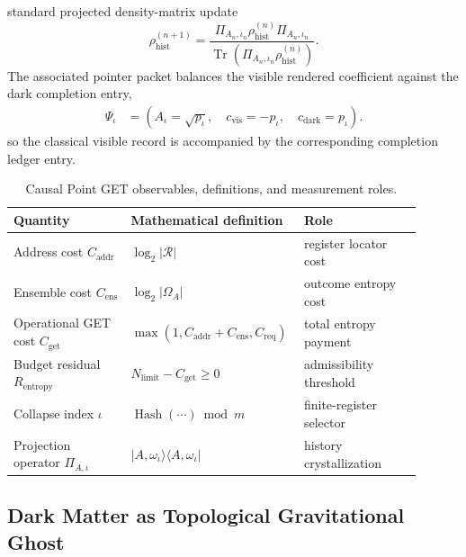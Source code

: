 \documentclass[11pt,letterpaper]{article}
\theoremstyle{plain}
\DeclareMathOperator{\Tr}{Tr}
\begin{document}
standard projected density-matrix update
\begin{equation}
\label{eq:precision-history-update}
 \rho_{\text{hist}}^{(n+1)}
 =
 \frac{
 \Pi_{A_n,\iota_n}\rho_{\text{hist}}^{(n)}\Pi_{A_n,\iota_n}}
 {\Tr\!\left(
 \Pi_{A_n,\iota_n}\rho_{\text{hist}}^{(n)}
 \right)}.
\end{equation}
The associated pointer packet balances the visible rendered coefficient
against the dark completion entry,
\begin{equation}
\label{eq:precision-pointer-wavefunction}
 \begin{aligned}
 \Psi_{\iota}
 &=
 \left(
 A_{\iota}=\sqrt{p_{\iota}},
 \quad
 c_{\text{vis}}=-p_{\iota},
 \quad
 c_{\text{dark}}=p_{\iota}
 \right).
 \end{aligned}
\end{equation}
so the classical visible record is accompanied by the corresponding completion
ledger entry.

\begin{table}[htbp]
\centering
\small
\begin{tabular}{@{}L{0.28\linewidth}L{0.34\linewidth}L{0.28\linewidth}@{}}
\toprule
Quantity & Mathematical definition & Role \\
\midrule
Address cost \(C_{\text{addr}}\) & \(\log_2|\mathcal R|\) & register locator cost \\
Ensemble cost \(C_{\text{ens}}\) & \(\log_2|\Omega_A|\) & outcome entropy cost \\
Operational GET cost \(C_{\text{get}}\) & \(\max(1,C_{\text{addr}}+C_{\text{ens}},C_{\text{req}})\) & total entropy payment \\
Budget residual \(R_{\text{entropy}}\) & \(N_{\text{limit}}-C_{\text{get}}\ge0\) & admissibility threshold \\
Collapse index \(\iota\) & \(\operatorname{Hash}(\cdots)\bmod m\) & finite-register selector \\
Projection operator \(\Pi_{A,\iota}\) & \(|A,\omega_\iota\rangle\langle A,\omega_\iota|\) & history crystallization \\
\bottomrule
\end{tabular}
\caption{Causal Point GET observables, definitions, and measurement roles.}
\label{tab:get-cost-metrics}
\end{table}

\subsection{Dark Matter as Topological Gravitational Ghost}
\label{sec:dark-matter-topological-ghost}
\end{document}
